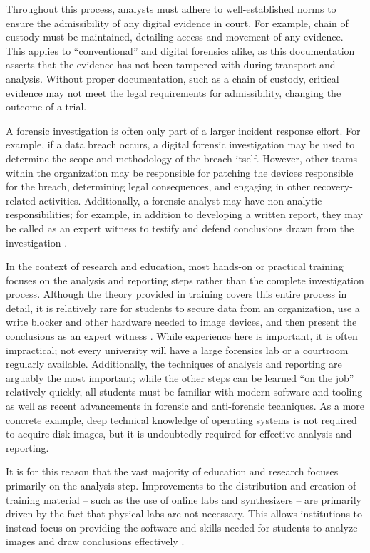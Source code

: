 \documentclass[letterpaper,12pt]{report}
\begin{document}
Throughout this process, analysts must adhere to well-established norms
to ensure the admissibility of any digital evidence in court. For
example, chain of custody must be maintained, detailing access and
movement of any evidence. This applies to ``conventional'' and digital
forensics alike, as this documentation asserts that the evidence has not
been tampered with during transport and analysis. Without proper
documentation, such as a chain of custody, critical evidence may not
meet the legal requirements for admissibility, changing the outcome of a
trial.

A forensic investigation is often only part of a larger incident
response effort. For example, if a data breach occurs, a digital
forensic investigation may be used to determine the scope and
methodology of the breach itself. However, other teams within the
organization may be responsible for patching the devices responsible for
the breach, determining legal consequences, and engaging in other
recovery-related activities. Additionally, a forensic analyst may have
non-analytic responsibilities; for example, in addition to developing a
written report, they may be called as an expert witness to testify and
defend conclusions drawn from the investigation
\cite{andersonComparativeStudyTeaching2006,conklinComputerForensics2022,cooperStandardsDigitalForensics2010}.

In the context of research and education, most hands-on or practical
training focuses on the analysis and reporting steps rather than the
complete investigation process. Although the theory provided in training
covers this entire process in detail, it is relatively rare for students
to secure data from an organization, use a write blocker and other
hardware needed to image devices, and then present the conclusions as an
expert witness \cite{cooperStandardsDigitalForensics2010}. While
experience here is important, it is often impractical; not every
university will have a large forensics lab or a courtroom regularly
available. Additionally, the techniques of analysis and reporting are
arguably the most important; while the other steps can be learned ``on
the job'' relatively quickly, all students must be familiar with modern
software and tooling as well as recent advancements in forensic and
anti-forensic techniques. As a more concrete example, deep technical
knowledge of operating systems is not required to acquire disk images,
but it is undoubtedly required for effective analysis and reporting.

It is for this reason that the vast majority of education and research
focuses primarily on the analysis step. Improvements to the distribution
and creation of training material -- such as the use of online labs and
synthesizers -- are primarily driven by the fact that physical labs are
not necessary. This allows institutions to instead focus on providing
the software and skills needed for students to analyze images and draw
conclusions effectively
\cite{bruecknerAutomatedComputerForensics2008,lawrenceFrameworkDesignWebbased2009}.
\end{document}
